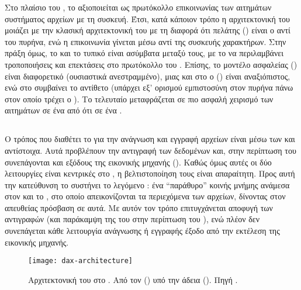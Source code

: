 Στο πλαίσιο του \viofs{}, το  αξιοποιείται ως πρωτόκολλο επικοινωνίας
των αιτημάτων συστήματος αρχείων με τη συσκευή. Έτσι, κατά κάποιον τρόπο η
αρχιτεκτονική του μοιάζει με την κλασική αρχιτεκτονική του  με τη
διαφορά ότι πελάτης () είναι ο  αντί του πυρήνα, ενώ η
επικοινωνία γίνεται μέσω  αντί της  συσκευής χαρακτήρων.
Στην πράξη όμως, το \viofs{} και το τυπικό  είναι ασύμβατα μεταξύ τους,
με το \viofs{} να περιλαμβάνει τροποποιήσεις και επεκτάσεις στο πρωτόκολλο του
. Επίσης, το μοντέλο ασφαλείας () είναι διαφορετικό
(ουσιαστικά ανεστραμμένο), μιας και στο \viofs{} ο  (\guest{}) είναι
αναξιόπιστος, ενώ στο  συμβαίνει το αντίθετο (υπάρχει εξ' ορισμού
εμπιστοσύνη στον πυρήνα πάνω στον οποίο τρέχει ο ). Το τελευταίο
μεταφράζεται σε πιο ασφαλή χειρισμό των αιτημάτων σε ένα \viofs{}  από ότι σε ένα .


\subsection{}

Ο τρόπος που διαθέτει το  για την ανάγνωση και εγγραφή αρχείων είναι
μέσω των  και  αντίστοιχα. Αυτά
προβλέπουν την αντιγραφή των δεδομένων και, στην περίπτωση του \viofs{}
συνεπάγονται και εξόδους της εικονικής μηχανής (). Καθώς όμως αυτές
οι δύο λειτουργίες είναι κεντρικές στο , η βελτιστοποίηση τους
είναι απαραίτητη. Προς αυτή την κατεύθυνση το \viofs{} συστήνει το λεγόμενο
: ένα ``παράθυρο'' κοινής μνήμης ανάμεσα στον \host{} και το
\guest{}, στο οποίο απεικονίζονται τα περιεχόμενα των αρχείων, δίνοντας στον
\guest{} απευθείας πρόσβαση σε αυτά. Με αυτόν τον τρόπο επιτυγχάνεται αποφυγή
των αντιγραφών (και παράκαμψη της  του  στην περίπτωση
του \linux{}), ενώ πλέον δεν συνεπάγεται κάθε λειτουργία ανάγνωσης ή εγγραφής
έξοδο από την εκτέλεση της εικονικής μηχανής.

\begin{figure}
    \centering
    \texttt{[image: dax-architecture]}
    \caption[Αρχιτεκτονική του  στο \viofs{}]{Αρχιτεκτονική του
         στο \viofs{}. Από τον 
        () υπό την άδεια 
        ().
        Πηγή
        .}
    \label{fig:dax-architecture}
\end{figure}

